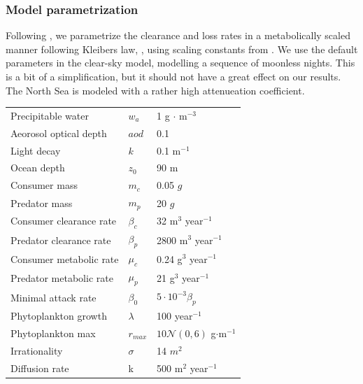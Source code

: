 
\subsubsection*{Model parametrization}
Following \citep{yodzis1991}, we parametrize the clearance and loss rates in a metabolically scaled manner following Kleibers law, \citep{kleiber}, using scaling constants from \citep{kha_2019}. We use the default parameters in the clear-sky model, modelling a sequence of moonless nights. This is a bit of a simplification, but it should not have a great effect on our results. The North Sea is modeled with a rather high attenueation coefficient.


\begin{tabular}{l | l | l}
  Precipitable water & $w_a$ & 1 g $\cdot$ m$^{-3}$\\
  Aeorosol optical depth & $aod$ & 0.1 \\
  Light decay & $k$ & 0.1 m$^{-1}$\\
  Ocean depth & $z_0$ & 90 m \\
  Consumer mass & $m_c$ & 0.05 $g$ \\
  Predator mass & $m_p$ & 20 $g$ \\
  Consumer clearance rate & $\beta_c$ & 32 m$^{3}$ year$^{-1}$ \\
  Predator clearance rate & $\beta_p$ & 2800 m$^3$ year$^{-1}$ \\
  Consumer metabolic rate & $\mu_c$ & 0.24 g$^{3}$ year$^{-1}$ \\
  Predator metabolic rate & $\mu_p$ & 21 g$^3$ year$^{-1}$ \\
  Minimal attack rate & $\beta_0$ & $5 \cdot 10^{-3} \beta_p$ \\
  Phytoplankton growth & $\lambda$ & 100 year$^{-1}$ \\
  Phytoplankton max & $r_{max}$ & $10\mathcal{N}(0,6)$ g$\cdot$m$^{-1}$ \\
  Irrationality & $\sigma$ & 14 $m^2$ \\
  Diffusion rate & k & 500 m$^{2}$ year$^{-1}$
\end{tabular}

